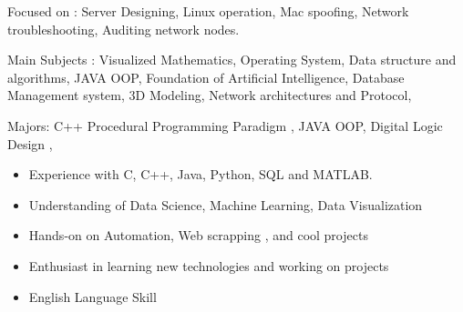 \documentclass[10pt,a4paper,ragged2e,withhyper]{altacv}
\begin{document}
\begin{paracol}{2}


\divider

\begin{outline}
\1 Focused on : 
\2 Server Designing, Linux operation, Mac spoofing, Network troubleshooting, Auditing network nodes.
\end{outline}
\divider

\divider


\begin{outline}
\1 Main Subjects : 
\2 Visualized Mathematics, Operating System, Data structure and algorithms, JAVA OOP, Foundation of Artificial Intelligence, Database Management system, 3D Modeling, Network architectures and Protocol,
\end{outline}              
\medskip
\divider
{}
\begin{outline}
\1 Majors: 
\2 C++ Procedural Programming Paradigm , JAVA OOP, Digital Logic Design , 
\end{outline}              
\medskip
\divider
{}
\medskip
\vspace{10mm}
\divider
{}
\medskip
\divider


\begin{itemize}
\item Experience with C, C++, Java, Python, SQL and MATLAB.
\item Understanding of Data Science, Machine Learning, Data Visualization
\item Hands-on on Automation, Web scrapping , and cool projects
\item Enthusiast in learning new technologies and working on projects 
\item English Language Skill
\end{itemize}


\end{paracol}
\end{document}
